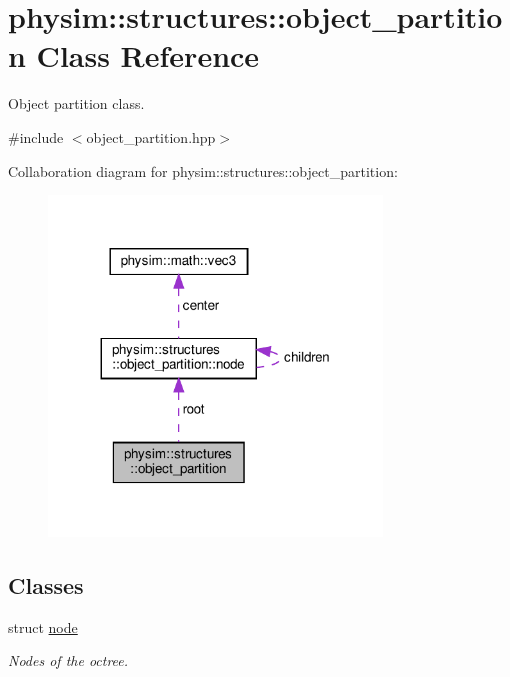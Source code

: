 \hypertarget{classphysim_1_1structures_1_1object__partition}{}\section{physim\+:\+:structures\+:\+:object\+\_\+partition Class Reference}
\label{classphysim_1_1structures_1_1object__partition}


Object partition class.  




{\ttfamily \#include $<$object\+\_\+partition.\+hpp$>$}



Collaboration diagram for physim\+:\+:structures\+:\+:object\+\_\+partition\+:\nopagebreak
\begin{figure}[H]
\begin{center}
\leavevmode
\includegraphics[width=251pt]{classphysim_1_1structures_1_1object__partition__coll__graph}
\end{center}
\end{figure}
\subsection*{Classes}
\begin{DoxyCompactItemize}
\item 
struct \hyperlink{structphysim_1_1structures_1_1object__partition_1_1node}{node}
\begin{DoxyCompactList}\small\item\em Nodes of the octree. \end{DoxyCompactList}\end{DoxyCompactItemize}
